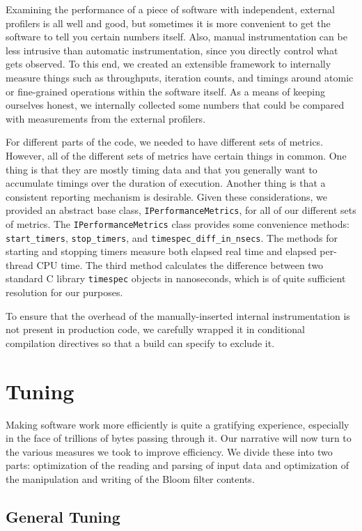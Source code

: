 \documentclass{article}
\begin{document}
Examining the performance of a piece of software with independent, external
profilers is all well and good, but sometimes it is more convenient to get the
software to tell you certain numbers itself. Also, manual instrumentation can
be less intrusive than automatic instrumentation, since you directly control
what gets observed. To this end, we created an extensible framework to
internally measure things such as throughputs, iteration counts, and timings
around atomic or fine-grained operations within the software itself. As a means
of keeping ourselves honest, we internally collected some numbers that could be
compared with measurements from the external profilers.

For different parts of the code, we needed to have different sets of metrics.
However, all of the different sets of metrics have certain things in common.
One thing is that they are mostly timing data and that you generally want to
accumulate timings over the duration of execution. Another thing is that a
consistent reporting mechanism is desirable. Given these considerations, we
provided an abstract base class, \texttt{IPerformanceMetrics}, for all of our
different sets of metrics. The \texttt{IPerformanceMetrics} class provides some
convenience methods: \texttt{start\_timers}, \texttt{stop\_timers}, and
\texttt{timespec\_diff\_in\_nsecs}. The methods for starting and stopping
timers measure both elapsed real time and elapsed per-thread CPU time. The
third method calculates the difference between two standard C library
\texttt{timespec} objects in nanoseconds, which is of quite sufficient
resolution for our purposes.

To ensure that the overhead of the manually-inserted internal instrumentation
is not present in production code, we carefully wrapped it in conditional
compilation directives so that a build can specify to exclude it.

\section{Tuning}

Making software work more efficiently is quite a gratifying experience,
especially in the face of trillions of bytes passing through it. Our narrative
will now turn to the various measures we took to improve efficiency. We
divide these into two parts: optimization of the reading and parsing of input
data and optimization of the manipulation and writing of the Bloom filter
contents.

\subsection{General Tuning}
\end{document}
